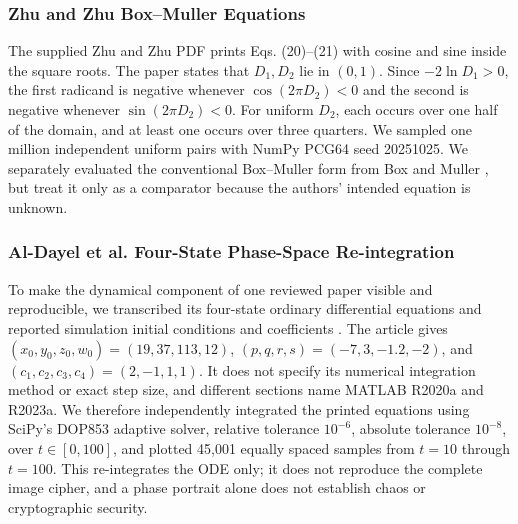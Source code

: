 \documentclass[letterpaper,journal]{IEEEtran}
\begin{document}
\subsubsection{Zhu and Zhu Box--Muller Equations}
The supplied Zhu and Zhu PDF prints Eqs. (20)--(21) with cosine and sine inside the square roots. The paper states that $D_1,D_2$ lie in $(0,1)$. Since $-2\ln D_1>0$, the first radicand is negative whenever $\cos(2\pi D_2)<0$ and the second is negative whenever $\sin(2\pi D_2)<0$. For uniform $D_2$, each occurs over one half of the domain, and at least one occurs over three quarters. We sampled one million independent uniform pairs with NumPy PCG64 seed 20251025. We separately evaluated the conventional Box--Muller form from Box and Muller \cite{boxmuller1958}, but treat it only as a comparator because the authors' intended equation is unknown.

\subsubsection{Al-Dayel et al. Four-State Phase-Space Re-integration}
To make the dynamical component of one reviewed paper visible and reproducible, we transcribed its four-state ordinary differential equations and reported simulation initial conditions and coefficients \cite{aldayel2025}. The article gives $(x_0,y_0,z_0,w_0)=(19,37,113,12)$, $(p,q,r,s)=(-7,3,-1.2,-2)$, and $(c_1,c_2,c_3,c_4)=(2,-1,1,1)$. It does not specify its numerical integration method or exact step size, and different sections name MATLAB R2020a and R2023a. We therefore independently integrated the printed equations using SciPy's DOP853 adaptive solver, relative tolerance $10^{-6}$, absolute tolerance $10^{-8}$, over $t\in[0,100]$, and plotted 45,001 equally spaced samples from $t=10$ through $t=100$. This re-integrates the ODE only; it does not reproduce the complete image cipher, and a phase portrait alone does not establish chaos or cryptographic security.
\end{document}
